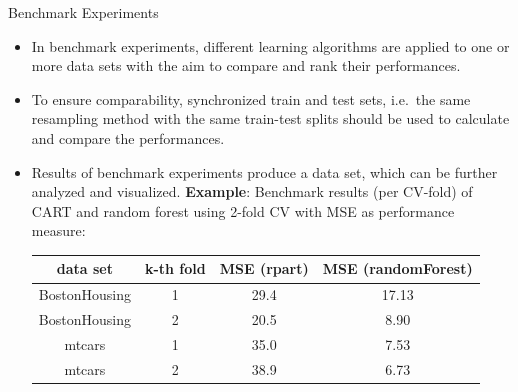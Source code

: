     \begin{frame}[c]{Benchmark Experiments}

    \begin{itemize}
    \item In benchmark experiments, different learning algorithms are applied to one or more data sets with the aim to compare and rank their performances.
    \item To ensure comparability, synchronized train and test sets, i.e.\ the same resampling method with the same train-test splits should be used to calculate and compare the performances.
    \item Results of benchmark experiments produce a data set, which can be further analyzed and visualized. 
    \newline
    \textbf{Example}: Benchmark results (per CV-fold) of CART and random forest using 2-fold CV with MSE as performance measure:

    \begin{center}
        \scriptsize
        \begin{tabular}{c|c|c|c}
        \hline
        data set & k-th fold & MSE (rpart) & MSE (randomForest)\\
        \hline
        BostonHousing & 1 & 29.4 & 17.13\\
        \hline
        BostonHousing & 2 & 20.5 & 8.90\\
        \hline
        mtcars & 1 & 35.0 & 7.53\\
        \hline
        mtcars & 2 & 38.9 & 6.73\\
        \hline
        \end{tabular}
    \end{center}
    \end{itemize}

    \end{frame}

